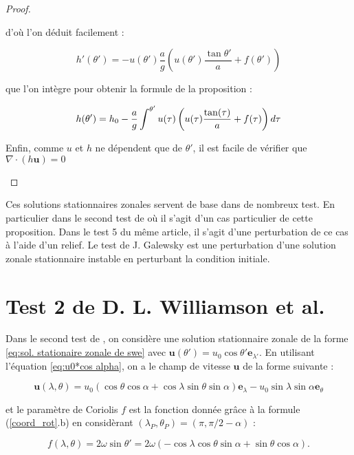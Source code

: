 \begin{proof}
\begin{itemize}
d'où l'on déduit facilement :

\begin{equation}
h'(\theta') = - u(\theta') \dfrac{a}{g} \left( u(\theta') \dfrac{\tan \theta'}{a} + f(\theta') \right)
\end{equation}

que l'on intègre pour obtenir la formule de la proposition :

\begin{equation}
h(\theta') = h_0 - \dfrac{a}{g} \displaystyle\int^{\theta'} u(\tau) \left( u(\tau) \dfrac{\tan (\tau)}{a} + f(\tau) \right) d\tau
\end{equation}

Enfin, comme $u$ et $h$ ne dépendent que de $\theta'$, il est facile de vérifier que $\nabla \cdot \left( h \mathbf{u} \right)=0$
\end{itemize}
\end{proof}

Ces solutions stationnaires zonales servent de base dans de nombreux test. En particulier dans le second test de \cite{Williamson1992} où il s'agit d'un cas particulier de cette proposition. Dans le test 5 du même article, il s'agit d'une perturbation de ce cas à l'aide d'un relief.
Le test de J. Galewsky \cite{Galewsky2004} est une perturbation d'une solution zonale stationnaire instable en perturbant la condition initiale.

\section{Test 2 de D. L. Williamson et al.}

Dans le second test de \cite{Williamson1992}, on considère une solution stationnaire zonale de la forme \eqref{eq:sol. stationaire zonale de swe} avec $\mathbf{u}(\theta')=u_0 \cos \theta' \mathbf{e}_{\lambda'}$. En utilisant l'équation \eqref{eq:u0*cos alpha}, on a le champ de vitesse $\mathbf{u}$ de la forme suivante :

\begin{equation}
\mathbf{u}(\lambda, \theta) = u_0 \left( \cos \theta \cos \alpha + \cos \lambda \sin \theta \sin \alpha \right) \mathbf{e}_{\lambda} - u_0 \sin \lambda \sin \alpha \mathbf{e}_{\theta}
\end{equation} 

et le paramètre de Coriolis $f$ est la fonction donnée grâce à la formule (\ref{coord_rot}.b) en considèrant $(\lambda_P, \theta_P) = (\pi, \pi/2 - \alpha)$ :

\begin{equation}
f (\lambda, \theta) = 2 \omega \sin \theta' = 2 \omega \left( - \cos \lambda \cos \theta \sin \alpha + \sin \theta \cos \alpha \right).
\end{equation}

